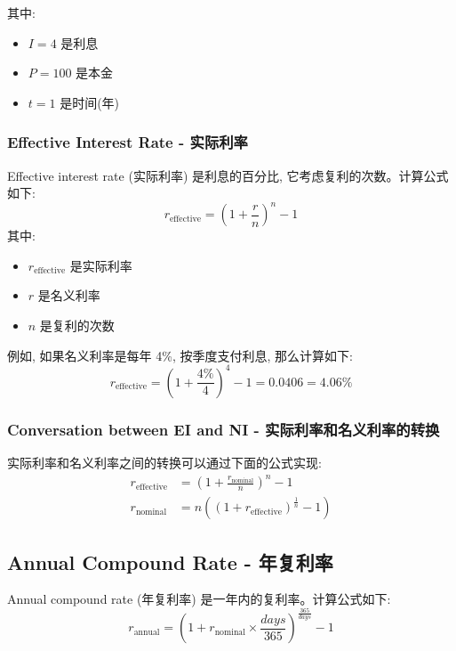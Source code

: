 其中: 
\begin{itemize}
    \item $I = 4$ 是利息
    \item $P = 100$ 是本金
    \item $t = 1$ 是时间(年)
\end{itemize}

\subsubsection{Effective Interest Rate - 实际利率}
Effective interest rate (实际利率) 是利息的百分比, 它考虑复利的次数。计算公式如下: 
\begin{equation}
    r_{\text{effective}} = \left(1 + \frac{r}{n}\right)^n - 1
\end{equation}
其中: 
\begin{itemize}
    \item $r_{\text{effective}}$ 是实际利率
    \item $r$ 是名义利率
    \item $n$ 是复利的次数
\end{itemize}

例如, 如果名义利率是每年 4\%, 按季度支付利息, 那么计算如下:
\begin{equation}
    r_{\text{effective}} = \left(1 + \frac{4\%}{4}\right)^4 - 1 = 0.0406 = 4.06\%
\end{equation}

\subsubsection{Conversation between EI and NI - 实际利率和名义利率的转换}
实际利率和名义利率之间的转换可以通过下面的公式实现: 
\begin{subequations}
    \begin{align}
        r_{\text{effective}} & = \left(1 + \frac{r_{\text{nominal}}}{n}\right)^n - 1                    \\
        r_{\text{nominal}}   & = n \left(\left(1 + r_{\text{effective}}\right)^{\frac{1}{n}} - 1\right)
    \end{align}
\end{subequations}

\subsection{Annual Compound Rate - 年复利率}
Annual compound rate (年复利率) 是一年内的复利率。计算公式如下: 
\begin{equation}
    r_{\text{annual}} = \left(1 + r_{\text{nominal}} \times \frac{days}{365}\right)^{\frac{365}{days}} - 1
\end{equation}

